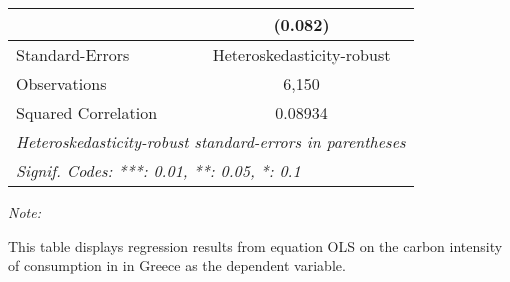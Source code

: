 \begin{table}[htbp!]
\begin{adjustbox}{width = 1\textwidth, max height = 0.95\textheight, center}
\begin{threeparttable}[b]
\begin{tabular}{lc}
                                & (0.082)\\   
            \midrule 
            Standard-Errors     & Heteroskedasticity-robust \\   
            Observations        & 6,150\\  
            Squared Correlation & 0.08934\\  
            \midrule \midrule
            \multicolumn{2}{l}{\emph{Heteroskedasticity-robust standard-errors in parentheses}}\\
            \multicolumn{2}{l}{\emph{Signif. Codes: ***: 0.01, **: 0.05, *: 0.1}}\\
         \end{tabular}
         
         \begin{tablenotes}\item \medskip \textit{Note:}
            \item This table displays regression results from equation OLS on the carbon intensity of consumption in  in Greece as the dependent variable. 
         \end{tablenotes}
      \end{threeparttable}
   \end{adjustbox}
\end{table}


